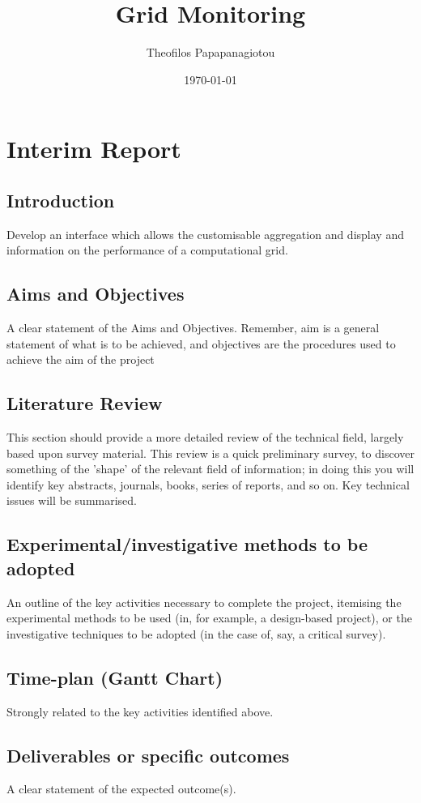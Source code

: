 \documentclass[a4paper,12pt,oneside]{book}
\begin{document}
\title{Grid Monitoring}
\author{Theofilos Papapanagiotou}
\date{\today}
\maketitle
\frontmatter

\tableofcontents
\clearpage
\mainmatter
\pagestyle{fancy}

\chapter[Interim Report]{Interim Report}
\section{Introduction}
Develop an interface which allows the customisable aggregation and display and
information on the performance of a computational grid.
\section{Aims and Objectives}
A clear statement of the Aims and Objectives. Remember, aim is a general statement of what
is to be achieved, and objectives are the procedures used to achieve the aim of the project
\section{Literature Review}
This section should provide a more detailed review of the technical field, largely based upon
survey material. This review is a quick preliminary survey, to discover something of the
'shape' of the relevant field of information; in doing this you will identify key abstracts,
journals, books, series of reports, and so on. Key technical issues will be summarised.
\section[Experimental]{Experimental/investigative methods to be adopted}
An outline of the key activities necessary to complete the project, itemising the experimental
methods to be used (in, for example, a design-based project), or the investigative techniques to
be adopted (in the case of, say, a critical survey).
\section[Time plan]{Time-plan (Gantt Chart)}
Strongly related to the key activities identified above.
\begin{center}
\end{center}
\section[Deliverables]{Deliverables or specific outcomes}
A clear statement of the expected outcome(s).
 
\cite{Bonacorsi2004,Byrom,Byroma,gerndt2004performance,Hobson2007,Huang2007,li2005grid,Taylor2006,zanikolas2007importance}


\backmatter



\end{document}
